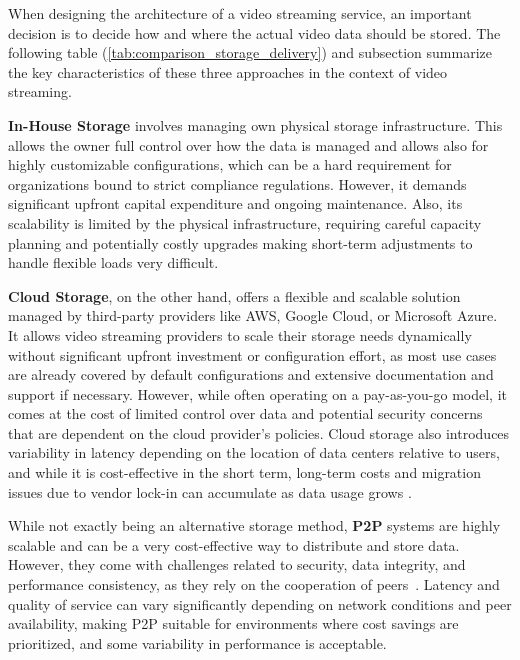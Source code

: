 When designing the architecture of a video streaming service, an important decision is to decide how and where the actual video data should be stored. The following table (\autoref{tab:comparison_storage_delivery}) and subsection summarize the key characteristics of these three approaches in the context of video streaming. 

\textbf{In-House Storage} involves managing own physical storage infrastructure. This allows the owner full control over how the data is managed and allows also for highly customizable configurations, which can be a hard requirement for organizations bound to strict compliance regulations. However, it demands significant upfront capital expenditure and ongoing maintenance. Also, its scalability is limited by the physical infrastructure, requiring careful capacity planning and potentially costly upgrades making short-term adjustments to handle flexible loads very difficult. 

\textbf{Cloud Storage}, on the other hand, offers a flexible and scalable solution managed by third-party providers like AWS, Google Cloud, or Microsoft Azure. It allows video streaming providers to scale their storage needs dynamically without significant upfront investment or configuration effort, as most use cases are already covered by default configurations and extensive documentation and support if necessary. However, while often operating on a pay-as-you-go model, it comes at the cost of limited control over data and potential security concerns that are dependent on the cloud provider's policies. Cloud storage also introduces variability in latency depending on the location of data centers relative to users, and while it is cost-effective in the short term, long-term costs and migration issues due to vendor lock-in can accumulate as data usage grows \parencite{cloud_streaming_cost}.

While not exactly being an alternative storage method, \textbf{\ac{P2P}} systems are highly scalable and can be a very cost-effective way to distribute and store data. However, they come with challenges related to security, data integrity, and performance consistency, as they rely on the cooperation of peers~\parencite{p2p}. Latency and quality of service can vary significantly depending on network conditions and peer availability, making \ac{P2P} suitable for environments where cost savings are prioritized, and some variability in performance is acceptable.

